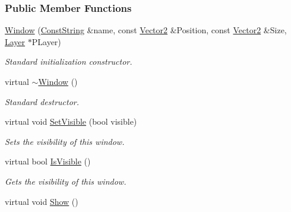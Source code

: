 \subsubsection*{Public Member Functions}
\begin{DoxyCompactItemize}
\item 
\hyperlink{classphys_1_1UI_1_1Window_a51ac8b391c03dded1f892cbbde7cdcf2}{Window} (\hyperlink{namespacephys_a5ce5049f8b4bf88d6413c47b504ebb31}{ConstString} \&name, const \hyperlink{classphys_1_1Vector2}{Vector2} \&Position, const \hyperlink{classphys_1_1Vector2}{Vector2} \&Size, \hyperlink{classphys_1_1UI_1_1Layer}{Layer} $\ast$PLayer)
\begin{DoxyCompactList}\small\item\em Standard initialization constructor. \item\end{DoxyCompactList}\item 
\hypertarget{classphys_1_1UI_1_1Window_a3480249de9950a3993c5e7f836aa8f59}{
virtual \hyperlink{classphys_1_1UI_1_1Window_a3480249de9950a3993c5e7f836aa8f59}{$\sim$Window} ()}
\label{classphys_1_1UI_1_1Window_a3480249de9950a3993c5e7f836aa8f59}

\begin{DoxyCompactList}\small\item\em Standard destructor. \item\end{DoxyCompactList}\item 
virtual void \hyperlink{classphys_1_1UI_1_1Window_a351439e78013bc87ecadcc00bce08573}{SetVisible} (bool visible)
\begin{DoxyCompactList}\small\item\em Sets the visibility of this window. \item\end{DoxyCompactList}\item 
virtual bool \hyperlink{classphys_1_1UI_1_1Window_aa1d88c50c0965510b494b51f3e5a7bf0}{IsVisible} ()
\begin{DoxyCompactList}\small\item\em Gets the visibility of this window. \item\end{DoxyCompactList}\item 
\hypertarget{classphys_1_1UI_1_1Window_af945bd84876d577d1dc6e1c7e28329a8}{
virtual void \hyperlink{classphys_1_1UI_1_1Window_af945bd84876d577d1dc6e1c7e28329a8}{Show} ()}
\label{classphys_1_1UI_1_1Window_af945bd84876d577d1dc6e1c7e28329a8}


\end{DoxyCompactItemize}
